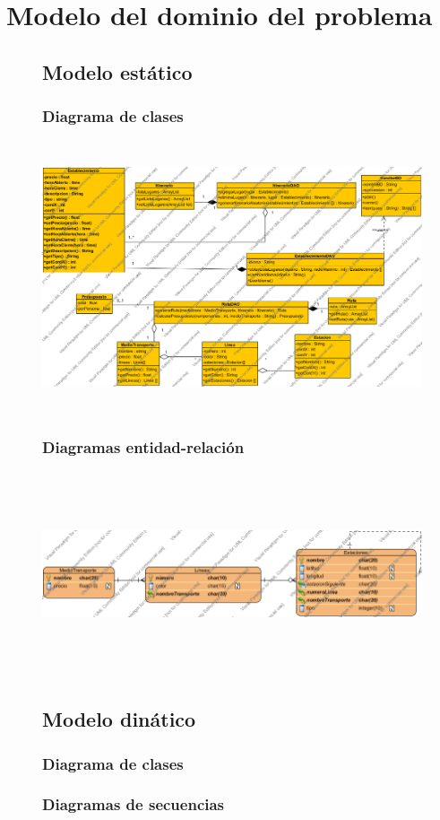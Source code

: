 \section{Modelo del dominio del problema}
\begin{figure}[h]

	\subsection{Modelo est\'atico}
		\subsubsection{Diagrama de clases}
		  \includegraphics[width=18cm,height=8cm]{Imagenes/DiagramaClases/Estatico.png}
		\subsubsection{Diagramas entidad-relaci\'on}
			\includegraphics[width=18cm,height=6cm]{Imagenes/BasedeDatos/2RISTEANDODB.png}
	\subsection{Modelo din\'atico}
		\subsubsection{Diagrama de clases}
		\subsubsection{Diagramas de secuencias}
  

\end{figure}
  
 